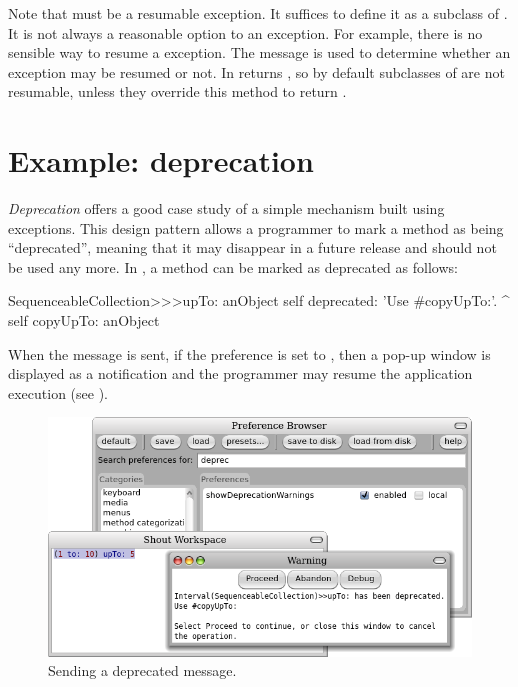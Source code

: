 \documentclass[a4paper,10pt,twoside]{book}
\begin{document}
Note that  must be a resumable exception. It suffices to define it as a subclass of .
It is not always a reasonable option to  an exception. For example, there is no sensible way to resume a  exception. The message  is used to determine whether an exception may be resumed or not. In  returns , so by default subclasses of  are not resumable, unless they override this method to return .

\section{Example: deprecation}

\emph{Deprecation} offers a good case study of a simple mechanism built using exceptions.
This design pattern allows a programmer to mark a method as being ``deprecated'', meaning that it may disappear in a future release and should not be used any more. In \pharo, a method can be marked as deprecated as follows:

\begin{code}{}
SequenceableCollection>>>upTo: anObject
	self deprecated: 'Use #copyUpTo:'.
	^ self copyUpTo: anObject
\end{code}

When the message  is sent, if the  preference is set to , then a pop-up window is displayed as a notification and the programmer may resume the application execution (see ).


\begin{figure}[ht]\centering
        \includegraphics[width=.8\linewidth]{Deprecation}
        \caption{Sending a deprecated message.}
\end{figure}
\end{document}
